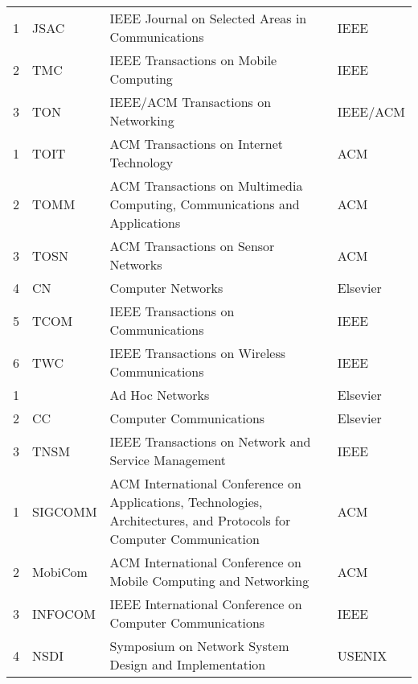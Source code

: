 \documentclass[doctor, vlined]{DissertUESTC}
\begin{document}
\begin{longtable}{m{2em}<{\centering} p{4.5em} p{15em} p{6em}}
		1 & JSAC & IEEE Journal on Selected Areas in Communications & IEEE \\
		2 & TMC & IEEE Transactions on Mobile Computing & IEEE \\
		3 & TON & IEEE/ACM Transactions on Networking & IEEE/ACM \\
		1 & TOIT & ACM Transactions on Internet Technology & ACM \\
		2 & TOMM & ACM Transactions on Multimedia Computing, Communications and Applications & ACM \\
		3 & TOSN & ACM Transactions on Sensor Networks & ACM \\
		4 & CN & Computer Networks & Elsevier \\
		5 & TCOM & IEEE Transactions on Communications & IEEE \\
		6 & TWC & IEEE Transactions on Wireless Communications & IEEE \\
		1 & & Ad Hoc Networks & Elsevier \\
		2 & CC & Computer Communications & Elsevier\tablenoteref{tn: 手动跨页表格附注标签Elsevier} \\
		3 & TNSM & IEEE Transactions on Network and Service Management & IEEE \\
		1 & SIGCOMM & ACM International Conference on Applications, Technologies, Architectures, and Protocols for Computer Communication & ACM \\
		2 & MobiCom & ACM International Conference on Mobile Computing and Networking & ACM \\
		3 & INFOCOM & IEEE International Conference on Computer Communications & IEEE \\
		4 & NSDI & Symposium on Network System Design and Implementation & USENIX\tablenoteref{tn: 手动跨页表格附注标签USENIX} \\

\end{longtable}
\end{document}

